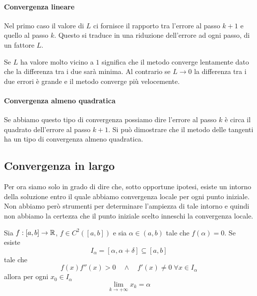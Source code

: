 \paragraph{Convergenza lineare}
Nel primo caso il valore di $L$ ci fornisce il rapporto tra l'errore al passo $k+1$ e quello al passo $k$. Questo
si traduce in una riduzione dell'errore ad ogni passo, di un fattore $L$.

Se $L$ ha valore molto vicino a $1$ significa che il metodo converge lentamente dato che la differenza tra i due
sarà minima. Al contrario se $L \to 0$ la differenza tra i due errori è grande e il metodo converge più
velocemente.

\paragraph{Convergenza almeno quadratica}
Se abbiamo questo tipo di convergenza possiamo dire l'errore al passo $k$ è circa il quadrato dell'errore al passo
$k+1$. Si può dimostrare che il metodo delle tangenti ha un tipo di convergenza almeno quadratica.

\subsection{Convergenza in largo}
Per ora siamo solo in grado di dire che, sotto opportune ipotesi, esiste un intorno della soluzione entro il quale
abbiamo convergenza locale per ogni punto iniziale. Non abbiamo però strumenti per determinare l'ampiezza di
tale intorno e quindi non abbiamo la certezza che il punto iniziale scelto inneschi la convergenza locale.

\begin{theorem}
	Sia $f : [a, b] \to \mathbb{R}$, $f \in C^2([a, b])$ e sia $\alpha \in (a, b)$ tale che $f(\alpha) = 0$. Se esiste
	\[ I_\alpha = [\alpha, \alpha + \delta] \subseteq [a, b] \]
	tale che
	\[ f(x) f''(x) > 0 \quad \wedge \quad f'(x) \neq 0 \; \forall x \in I_\alpha \]
	allora per ogni $x_0 \in I_\alpha$
	\[ \lim_{k \to +\infty} x_k = \alpha \]
\end{theorem}